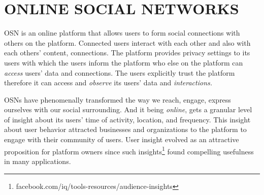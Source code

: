 \documentclass[a4paper,twoside]{article}
\begin{document}











\section{ONLINE SOCIAL NETWORKS}
\label{sec:social-networks}
\noindent OSN is an online platform that allows users to form social
connections with others on the platform. Connected users interact with
each other and also with each others' content, connections. The
platform provides privacy settings to its users with which the users
inform the platform who else on the platform can \textit{access}
users' data and connections. The users explicitly trust the platform
therefore it can access and \textit{observe} its users' data and
\textit{interactions.}

OSNs have phenomenally transformed the way we reach, engage, express
ourselves with our social surrounding. And it being \textit{online},
gets a granular level of insight about its users' time of activity,
location, and frequency. This insight about user behavior attracted
businesses and organizations to the platform to engage with their
community of users. User insight evolved as an attractive proposition
for platform owners since such
insights\footnote{facebook.com/iq/tools-resources/audience-insights}
found compelling usefulness in many applications.
\end{document}
